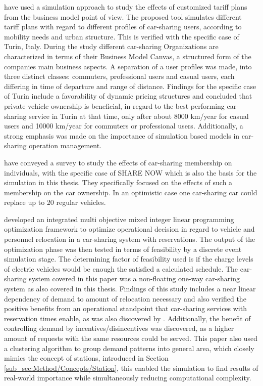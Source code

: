  have used a simulation approach to study the effects of customized
tariff plans from the business model point of view. The proposed tool simulates different tariff plans
with regard to different profiles of car-sharing users, according to mobility needs and urban structure.
This is verified with the specific case of Turin, Italy. During the study different car-sharing Organizations
are characterized in terms of their Business Model Canvas, a structured form of the companies main business
aspects. A separation of a user profiles was made, into three distinct classes: commuters, professional users
and casual users, each differing in time of departure and range of distance. Findings for the specific
case of Turin include a favorability of dynamic pricing structures and concluded that private vehicle ownership
is beneficial, in regard to the best performing car-sharing service in Turin at that time, only after about 8000 km/year
for casual users and 10000 km/year for commuters or professional users. Additionally, a strong emphasis was 
made on the importance of simulation based models in car-sharing operation management.

 have conveyed a survey to study the effects of car-sharing
membership on individuals, with the specific case of SHARE NOW which is also the basis
for the simulation in this thesis. They specifically focused on the effects of such a 
membership on the car ownership. In an optimistic case one car-sharing car could replace
up to 20 regular vehicles. 

 developed an integrated multi objective mixed integer
linear programming optimization framework to optimize operational decision in regard to
vehicle and personnel relocation in a car-sharing system with reservations. The output of 
the optimization phase was then tested in terms of feasibility by a discrete event simulation
stage. The determining factor of feasibility used is if the charge levels of electric vehicles
would be enough the satisfied a calculated schedule. The car-sharing system covered in this paper
was a non-floating one-way car-sharing system as also covered in this thesis. Findings of this
study includes a near linear dependency of demand to amount of relocation necessary and also
verified the positive benefits from an operational standpoint that car-sharing services with reservation
times enable, as was also discovered by . Additionally, the benefit of controlling
demand by incentives/disincentives was discovered, as a higher amount of requests with the same 
resources could be served. This paper also used a clustering algorithm to group demand patterns into
general area, which closely mimics the concept of stations, introduced in Section \ref{sub_sec:Method/Concepts/Station},
this enabled the simulation to find results of real-world importance while simultaneously reducing
computational complexity.
